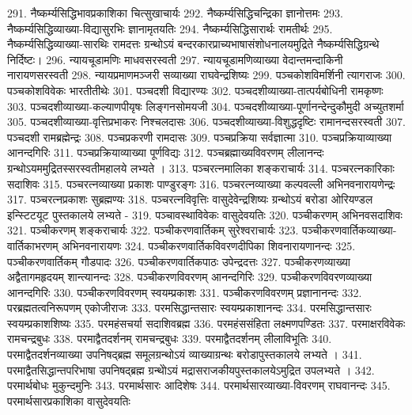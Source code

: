 291. नैष्कर्म्यसिद्धिभावप्रकाशिका		चित्सुखाचार्यः
292. नैष्कर्म्यसिद्धिचन्द्रिका 			ज्ञानोत्तमः 
293. नैष्कर्म्यसिद्धिव्याख्या-विद्यासुरभिः ज्ञानामृतयतिः 
294. नैष्कर्म्यसिद्धिसारार्थः				रामतीर्थः
295.	नैष्कर्म्यसिद्धिव्याख्या-सारथिः	रामदत्तः
		ग्रन्थोऽयं बन्दरकारप्राच्यभाषासंशोधनालयमुद्रिते नैष्कर्म्यसिद्धिग्रन्थे निर्दिष्टः। 
296. न्यायचूडामणिः					माधवसरस्वती
297. न्यायचूडामणिव्याख्या वेदान्तमन्दाकिनी नारायणसरस्वती
298. न्यायप्रमाणमञ्जरी सव्याख्या		राघवेन्द्रशिष्यः
299. पञ्चकोशविमर्शिनी					त्यागराजः
300. पञ्चकोशविवेकः					भारतीतीथेः
301. पञ्चदशी								विद्यारण्यः
302. पञ्चदशीव्याख्या-तात्पर्यबोधिनी	रामकृष्णः
303. पञ्चदशीव्याख्या-कल्याणपीयृषः	लिङ्गनसोमयजी 
304. पञ्चदशीव्याख्या-पूर्णानन्देन्दुकौमुदी अच्युतशर्मा
305. पञ्चदशीव्याख्या-वृत्तिप्रभाकरः 	निश्चलदासः
306. पञ्चदशीव्याख्या-विशुद्धदृष्टिः		रामानन्दसरस्वती
307. पञ्चदशी							रामब्रह्मेन्द्रः
308.	पञ्चप्रकरणी						रामदासः
309. पञ्चप्रक्रिया							सर्वज्ञात्मा
310. पञ्चप्रक्रियाव्याख्या					आनन्दगिरिः
311. पञ्चप्रक्रियाव्याख्या					पूर्णविद्यः
312. पञ्चब्रह्माख्यविवरणम्				लीलानन्दः
		ग्रन्थोऽयममुद्रितस्सरस्वतीमहालये लभ्यते ।
313. पञ्चरत्नमालिका					शङ्कराचार्यः
314. पञ्चरत्नकारिकाः					सदाशिवः
315. पञ्चरत्नव्याख्या प्रकाशः			पाण्डुरङ्गः
316. पञ्चरत्नव्याख्या कल्पवल्ली			अभिनवनारायणेन्द्रः
317. पञ्चरत्नप्रकाशः						सुब्रह्मण्यः
318. पञ्चरत्नविवृत्तिः 					वासुदेवेन्द्रशिष्यः 
		ग्रन्थोऽयं बरोडा ओरियण्डल इन्स्टिटयूट पुस्तकालये लभ्यते -
319. पञ्चावस्थाविवेकः 					वासुदेवयतिः
320. पञ्चीकरणम् 						अभिनवसदाशिवः
321. पञ्चीकरणम्							शङ्कराचार्यः
322. पञ्चीकरणवार्तिकम् 				सुरेश्वराचार्यः
323. पञ्चीकरणवार्तिकव्याख्या-वार्तिकाभरणम् अभिनवनारायणः
324. पञ्चीकरणवार्तिकविवरणदीपिका	शिवनारायणानन्दः
325. पञ्चीकरणवार्तिकम् 				गौडपादः
326. पञ्चीकरणवार्तिकपाठः				उपेन्द्रदत्तः
327. पञ्चीकरणव्याख्या अद्वैतागमहृदयम् शान्त्यानन्दः
328. पञ्चीकरणविवरणम् 				आनन्दगिरिः
329. पञ्चीकरणविवरणव्याख्या			आनन्दगिरिः
330. पञ्चीकरणविवरणम् 				स्वयम्प्रकाशः
331. पञ्चीकरणविवरणम् 				प्रज्ञानानन्दः
332.	परब्रह्मतत्वनिरूपणम् 				एकोजीराजः
333. परमसिद्धान्तसारः					स्वयम्प्रकाशानन्दः
334. परमसिद्धान्तसारः					स्वयम्प्रकाशशिष्यः
335. परमहंसचर्या						सदाशिवब्रह्म
336.	परमहंससंहिता					लक्ष्मणपण्डितः
337. परमाक्षरविवेकः					रामचन्द्रबुधः
338. परमाद्वैतदर्शनम् 					रामचन्द्रबुधः
339. परमाद्वैतदर्शनम्					लीलाविभूतिः
340. परमाद्वैतदर्शनव्याख्या				उपनिषद्ब्रह्म
		समूलग्रन्थोऽयं व्याख्याग्रन्थः बरोडापुस्तकालये लभ्यते । 
341. परमाद्वैतसिद्धान्तपरिभाषा			उपनिषद्ब्रह्म
		ग्रन्थोेऽयं मद्रासराजकीयपुस्तकालयेऽमुद्रित उपलभ्यते । 
342. परमार्थबोधः						मुकुन्दमुनिः 
343.	परमार्थसारः						आदिशेषः
344. परमार्थसारव्याख्या-विवरणम् 	राघवानन्दः
345. परमार्थसारप्रकाशिका				वासुदेवयतिः
